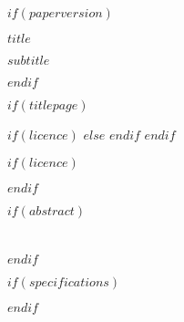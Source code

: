 \documentclass[
    $if(papersize)$
        $papersize$,
    $else$
        a4paper,
    $endif$
    $if(fontsize)$
        $fontsize$,
    $else$
        11pt,
    $endif$
    $for(classoption)$$classoption$,$endfor$
    onecolumn,
    titlepage,
    french,
]{$if(documentclass)$$documentclass$$else$report$endif$}
\begin{document}

    $if(paperversion)$
    \begin{titlepage}
        \label{halfpage}
        \mbox{}
        \sffamily
        \begin{center}
            {\Large
                $title$ \par
            }
            \vspace{\baselineskip}
            {\normalsize
                $subtitle$
            }
        \end{center}
    \end{titlepage}
    \cleardoublepage
    $endif$



    $if(titlepage)$
        \label{titlepage}
        
        $if(licence)$
        $else$
            \cleardoublepage
        $endif$
    $endif$



    $if(licence)$
        \label{licence}
        \thispagestyle{empty}
        
        \newpage
    $endif$


    $if(abstract)$
    \thispagestyle{plain}
    \section*{\abstractname}
    
    \cleardoublepage
    $endif$



    $if(specifications)$
        
        \cleardoublepage
    $endif$
\end{document}
